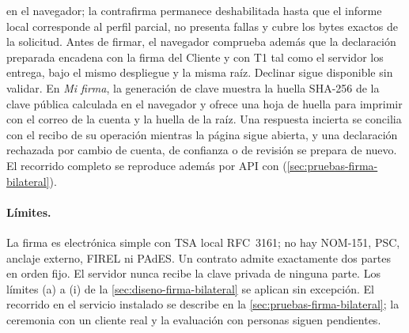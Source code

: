 en el navegador; la contrafirma permanece deshabilitada hasta que el informe
local corresponde al perfil parcial, no presenta fallas y cubre los bytes
exactos de la solicitud. Antes de firmar, el navegador comprueba además que la
declaración preparada encadena con la firma del Cliente y con T1 tal como el
servidor los entrega, bajo el mismo despliegue y la misma raíz. Declinar sigue
disponible sin validar. En \emph{Mi firma}, la generación de clave muestra la
huella SHA-256 de la clave pública calculada en el navegador y ofrece una hoja
de huella para imprimir con el correo de la cuenta y la huella de la raíz. Una
respuesta incierta se concilia con el recibo de su operación mientras la
página sigue abierta, y una declaración rechazada por cambio de cuenta, de
confianza o de revisión se prepara de nuevo. El recorrido completo se
reproduce además por API con 
(\cref{sec:pruebas-firma-bilateral}).

\paragraph{Límites.} La firma es electrónica simple con TSA local RFC~3161; no
hay NOM-151, PSC, anclaje externo, FIREL ni PAdES. Un contrato admite
exactamente dos partes en orden fijo. El servidor nunca recibe la clave privada
de ninguna parte. Los límites (a) a (i) de la \cref{sec:diseno-firma-bilateral}
se aplican sin excepción. El recorrido en el servicio instalado se describe en
la \cref{sec:pruebas-firma-bilateral}; la ceremonia con un cliente real y la
evaluación con personas siguen pendientes.

